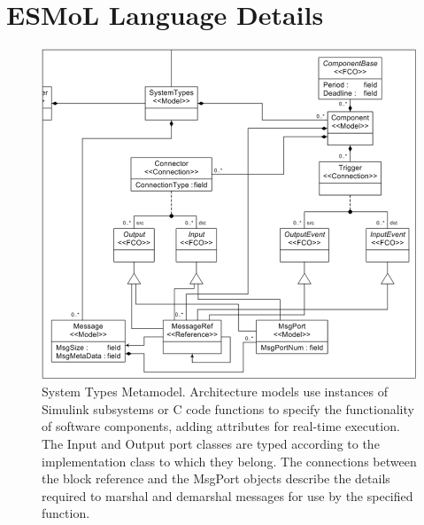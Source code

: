 %

\section{ESMoL Language Details}

\begin{figure}
	\centering
	\includegraphics[width=0.85\columnwidth]{figures/arch_lang.png}
	\caption{System Types Metamodel. Architecture models use instances of Simulink subsystems or 
C code functions to specify the functionality of software components, adding attributes for real-time execution. The Input and Output port
classes are typed according to the implementation class to which they belong. The connections between the block reference and the MsgPort objects describe the details required to marshal and demarshal messages for use by the specified function.}
	\label{fig:arch}
\end{figure}

